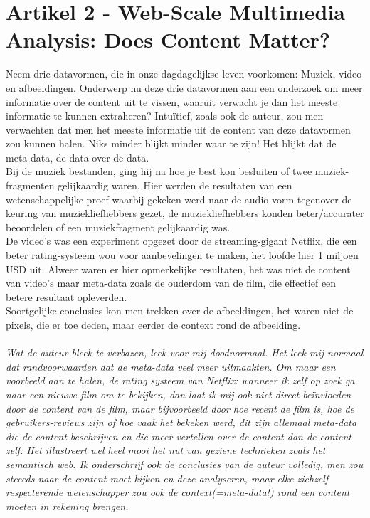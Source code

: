 \documentclass[11pt,a4paper]{article}
\begin{document}
\section*{Artikel 2 - Web-Scale Multimedia Analysis: Does Content Matter?}
Neem drie datavormen, die in onze dagdagelijkse leven voorkomen: Muziek, video en afbeeldingen. Onderwerp nu deze drie datavormen aan een onderzoek om meer informatie over de content uit te vissen, waaruit verwacht je dan het meeste informatie te kunnen extraheren? Intu\"{i}tief, zoals ook de auteur, zou men verwachten dat men het meeste informatie uit de content van deze datavormen zou kunnen halen. Niks minder blijkt minder waar te zijn! Het blijkt dat de meta-data, de data over de data. \\
Bij de muziek bestanden, ging hij na hoe je best kon besluiten of twee muziek-fragmenten gelijkaardig waren. Hier werden de resultaten van een wetenschappelijke proef waarbij gekeken werd naar de audio-vorm tegenover de keuring van muziekliefhebbers gezet, de muziekliefhebbers konden beter/accurater beoordelen of een muziekfragment gelijkaardig was. \\ De video's was een experiment opgezet door de streaming-gigant Netflix, die een beter rating-systeem wou voor aanbevelingen te maken, het loofde hier 1 miljoen USD uit. Alweer waren er hier opmerkelijke resultaten, het was niet de content van video's maar meta-data zoals de ouderdom van de film, die effectief een betere resultaat opleverden. \\
Soortgelijke conclusies kon men trekken over de afbeeldingen, het waren niet de pixels, die er toe deden, maar eerder de context rond de afbeelding.\\
\\
\textit{Wat de auteur bleek te verbazen, leek voor mij doodnormaal. Het leek mij normaal dat randvoorwaarden dat de meta-data veel meer uitmaakten. Om maar een voorbeeld aan te halen, de rating systeem van Netflix: wanneer ik zelf op zoek ga naar een nieuwe film om te bekijken, dan laat ik mij ook niet  direct be\"{i}nvloeden door de content van de film, maar bijvoorbeeld door hoe recent de film is, hoe de gebruikers-reviews zijn of hoe vaak het bekeken werd, dit zijn allemaal meta-data die de content beschrijven en die meer vertellen over de content dan de content zelf. Het illustreert wel heel mooi het nut van geziene technieken zoals het semantisch web. Ik onderschrijf ook de conclusies van de auteur volledig, men zou steeeds naar de content moet kijken en deze analyseren, maar elke zichzelf respecterende wetenschapper zou ook de context(=meta-data!) rond een content moeten in rekening brengen.}
\end{document}

